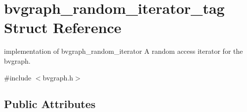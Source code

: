 \hypertarget{structbvgraph__random__iterator__tag}{\section{bvgraph\+\_\+random\+\_\+iterator\+\_\+tag Struct Reference}
\label{structbvgraph__random__iterator__tag}
}


implementation of bvgraph\+\_\+random\+\_\+iterator A random access iterator for the bvgraph.  




{\ttfamily \#include $<$bvgraph.\+h$>$}

\subsection*{Public Attributes}

